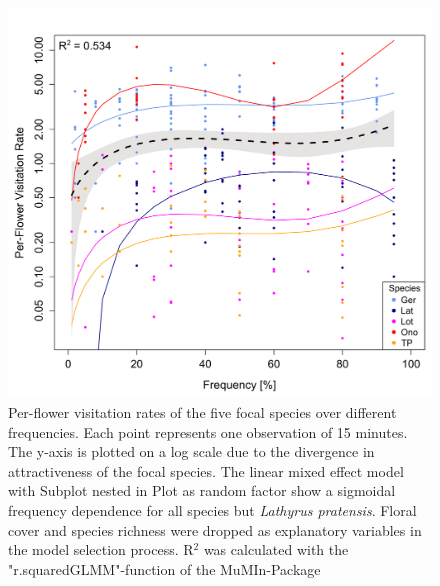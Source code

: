\begin{figure}  [H] %
\centering
\includegraphics[width=14cm]{Images/LME}
 \caption{Per-flower visitation rates of the five focal species over different frequencies. Each point represents one observation of 15 minutes. The y-axis is plotted on a log scale due to the divergence in attractiveness of the focal species. The linear mixed effect model with Subplot nested in Plot as random factor show a sigmoidal frequency dependence for all species but \textit{Lathyrus pratensis}. Floral cover and species richness were dropped as explanatory variables in the model selection process. R$^{2}$ was calculated with the "r.squaredGLMM"-function of the MuMIn-Package \citep{MuMIn}}
 \label{fig:LME}
\end{figure}

